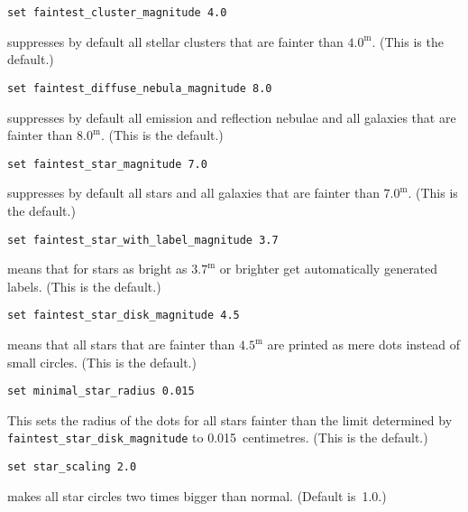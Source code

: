 \documentclass{article}
\begin{document}
\begin{multicols*}{3}
\begin{lstlisting}
set faintest_cluster_magnitude 4.0
\end{lstlisting}
suppresses by default all stellar clusters that are fainter than $4.0^{\mathrm
  m}$.  (This is the default.)\vspace{\bigskipamount}\pagebreak[2]

\begin{lstlisting}
set faintest_diffuse_nebula_magnitude 8.0
\end{lstlisting}
suppresses by default all emission and reflection nebulae and all galaxies that
are fainter than $8.0^{\mathrm m}$.  (This is the default.)\vspace{\bigskipamount}\pagebreak[2]

\begin{lstlisting}
set faintest_star_magnitude 7.0
\end{lstlisting}
suppresses by default all stars and all galaxies that are fainter than
$7.0^{\mathrm m}$.  (This is the default.)\vspace{\bigskipamount}\pagebreak[2]

\begin{lstlisting}
set faintest_star_with_label_magnitude 3.7
\end{lstlisting}
means that for stars as bright as $3.7^{\mathrm m}$ or brighter get
automatically generated labels.  (This is the default.)\vspace{\bigskipamount}\pagebreak[2]

\begin{lstlisting}
set faintest_star_disk_magnitude 4.5
\end{lstlisting}
means that all stars that are fainter than $4.5^{\mathrm m}$ are printed as
mere dots instead of small circles.  (This is the default.)\vspace{\bigskipamount}\pagebreak[2]

\begin{lstlisting}
set minimal_star_radius 0.015
\end{lstlisting}
This sets the radius of the dots for all stars fainter than the limit
determined by \lstinline{faintest_star_disk_magnitude} to
0.015~centimetres.  (This is the default.)\vspace{\bigskipamount}\pagebreak[2]

\begin{lstlisting}
set star_scaling 2.0
\end{lstlisting}
makes all star circles two times bigger than normal.  (Default
is~1.0.)\vspace{\bigskipamount}\pagebreak[2]


\end{multicols*}
\end{document}
